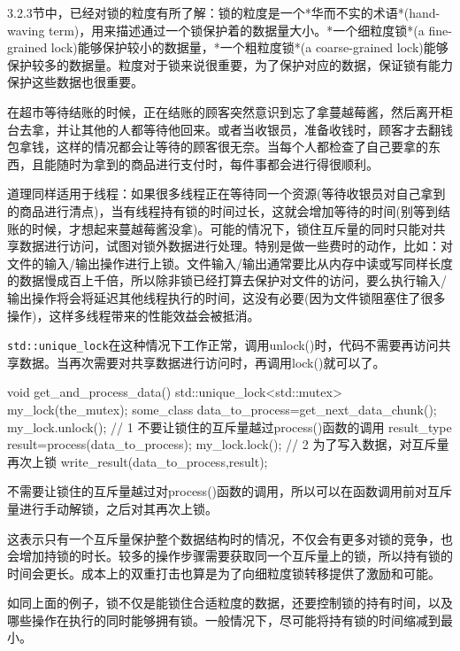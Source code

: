 
3.2.3节中，已经对锁的粒度有所了解：锁的粒度是一个*华而不实的术语*(hand-waving term)，用来描述通过一个锁保护着的数据量大小。*一个细粒度锁*(a fine-grained lock)能够保护较小的数据量，*一个粗粒度锁*(a coarse-grained lock)能够保护较多的数据量。粒度对于锁来说很重要，为了保护对应的数据，保证锁有能力保护这些数据也很重要。

在超市等待结账的时候，正在结账的顾客突然意识到忘了拿蔓越莓酱，然后离开柜台去拿，并让其他的人都等待他回来。或者当收银员，准备收钱时，顾客才去翻钱包拿钱，这样的情况都会让等待的顾客很无奈。当每个人都检查了自己要拿的东西，且能随时为拿到的商品进行支付时，每件事都会进行得很顺利。

道理同样适用于线程：如果很多线程正在等待同一个资源(等待收银员对自己拿到的商品进行清点)，当有线程持有锁的时间过长，这就会增加等待的时间(别等到结账的时候，才想起来蔓越莓酱没拿)。可能的情况下，锁住互斥量的同时只能对共享数据进行访问，试图对锁外数据进行处理。特别是做一些费时的动作，比如：对文件的输入/输出操作进行上锁。文件输入/输出通常要比从内存中读或写同样长度的数据慢成百上千倍，所以除非锁已经打算去保护对文件的访问，要么执行输入/输出操作将会将延迟其他线程执行的时间，这没有必要(因为文件锁阻塞住了很多操作)，这样多线程带来的性能效益会被抵消。

\texttt{std::unique\_lock}在这种情况下工作正常，调用unlock()时，代码不需要再访问共享数据。当再次需要对共享数据进行访问时，再调用lock()就可以了。

\begin{cpp}
void get_and_process_data()
{
  std::unique_lock<std::mutex> my_lock(the_mutex);
  some_class data_to_process=get_next_data_chunk();
  my_lock.unlock();  // 1 不要让锁住的互斥量越过process()函数的调用
  result_type result=process(data_to_process);
  my_lock.lock(); // 2 为了写入数据，对互斥量再次上锁
  write_result(data_to_process,result);
}
\end{cpp}

不需要让锁住的互斥量越过对process()函数的调用，所以可以在函数调用前对互斥量进行手动解锁，之后对其再次上锁。

这表示只有一个互斥量保护整个数据结构时的情况，不仅会有更多对锁的竞争，也会增加持锁的时长。较多的操作步骤需要获取同一个互斥量上的锁，所以持有锁的时间会更长。成本上的双重打击也算是为了向细粒度锁转移提供了激励和可能。

如同上面的例子，锁不仅是能锁住合适粒度的数据，还要控制锁的持有时间，以及哪些操作在执行的同时能够拥有锁。一般情况下，尽可能将持有锁的时间缩减到最小。

